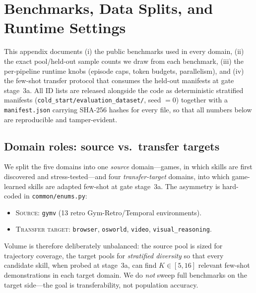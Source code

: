%      

\section{Benchmarks, Data Splits, and Runtime Settings}
\label{app:benchmarks}

This appendix documents (i) the public benchmarks used in every domain,
(ii) the exact pool/held-out sample counts we draw from each benchmark,
(iii) the per-pipeline runtime knobs (episode caps, token budgets,
parallelism), and (iv) the few-shot transfer protocol that consumes the
held-out manifests at gate stage~3a. All ID lists are released alongside
the code as deterministic stratified manifests
(\texttt{cold\_start/evaluation\_dataset/}, seed $=0$) together with a
\texttt{manifest.json} carrying SHA-256 hashes for every file, so that
all numbers below are reproducible and tamper-evident.

\subsection{Domain roles: source vs.\ transfer targets}
\label{app:bench-roles}

We split the five domains into one \emph{source} domain---games, in
which skills are first discovered and stress-tested---and four
\emph{transfer-target} domains, into which game-learned skills are
adapted few-shot at gate stage~3a. The asymmetry is hard-coded in
\texttt{common/enums.py}:
\begin{itemize}
  \item \textsc{Source}: \texttt{gymv} (13 retro Gym-Retro/Temporal
        environments).
  \item \textsc{Transfer target}: \texttt{browser}, \texttt{osworld},
        \texttt{video}, \texttt{visual\_reasoning}.
\end{itemize}
Volume is therefore deliberately unbalanced: the source pool is sized
for trajectory coverage, the target pools for \emph{stratified
diversity} so that every candidate skill, when probed at stage~3a, can
find $K\!\in\![5,16]$ relevant few-shot demonstrations in each target
domain. We do \emph{not} sweep full benchmarks on the target side---the
goal is transferability, not population accuracy.

